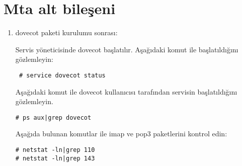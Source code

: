 \documentclass[a4paper,10pt]{article}
\begin{document}
\section{Mta alt bileşeni}
\begin{enumerate}
 \item dovecot paketi kurulumu sonrası:

Servis yöneticisinde dovecot başlatılır.
Aşağıdaki komut ile başlatıldığını gözlemleyin:
\begin{verbatim}
 # service dovecot status
\end{verbatim}
Aşağıdaki komut ile dovecot kullanıcısı tarafından servisin başlatıldığını gözlemleyin.
\begin{verbatim}
# ps aux|grep dovecot 
\end{verbatim}

Aşağıda bulunan komutlar ile imap ve pop3 paketlerini kontrol edin:
\begin{verbatim}
# netstat -ln|grep 110
# netstat -ln|grep 143
\end{verbatim}

\end{enumerate}
\end{document}
